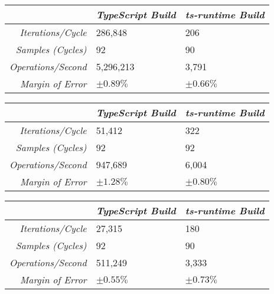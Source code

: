 \begin{center}
{
\centering
\tabulinesep=1.2mm
\setlength{\tabcolsep}{5mm}
\def\arraystretch{1.25}
\small
\begin{tabu} to \textwidth {|r||X[c,m]|X[c,m]|}
  \hline
  & \emph{TypeScript Build} & \emph{ts-runtime Build} \\
  \hline
  \hline
  \emph{Iterations/Cycle}  & 286,848 & 206 \\
  \hline
  \emph{Samples (Cycles)}  & 92 & 90 \\
  \hline
  \emph{Operations/Second} & 5,296,213 & 3,791 \\
  \hline
  \emph{Margin of Error}   & $\pm 0.89\%$ & $\pm 0.66\%$ \\
  \hline
\end{tabu}
}
\end{center}

\begin{center}
{
\centering
\tabulinesep=1.2mm
\setlength{\tabcolsep}{5mm}
\def\arraystretch{1.25}
\small
\begin{tabu} to \textwidth {|r||X[c,m]|X[c,m]|}
  \hline
  & \emph{TypeScript Build} & \emph{ts-runtime Build} \\
  \hline
  \hline
  \emph{Iterations/Cycle}  & 51,412 & 322 \\
  \hline
  \emph{Samples (Cycles)}  & 92 & 92 \\
  \hline
  \emph{Operations/Second} & 947,689 & 6,004 \\
  \hline
  \emph{Margin of Error}   & $\pm 1.28\%$ & $\pm 0.80\%$ \\
  \hline
\end{tabu}
}
\end{center}

\begin{center}
{
\centering
\tabulinesep=1.2mm
\setlength{\tabcolsep}{5mm}
\def\arraystretch{1.25}
\small
\begin{tabu} to \textwidth {|r||X[c,m]|X[c,m]|}
  \hline
  & \emph{TypeScript Build} & \emph{ts-runtime Build} \\
  \hline
  \hline
  \emph{Iterations/Cycle}  & 27,315 & 180 \\
  \hline
  \emph{Samples (Cycles)}  & 92 & 90 \\
  \hline
  \emph{Operations/Second} & 511,249 & 3,333 \\
  \hline
  \emph{Margin of Error}   & $\pm 0.55\%$ & $\pm 0.73\%$ \\
  \hline
\end{tabu}
}
\end{center}

